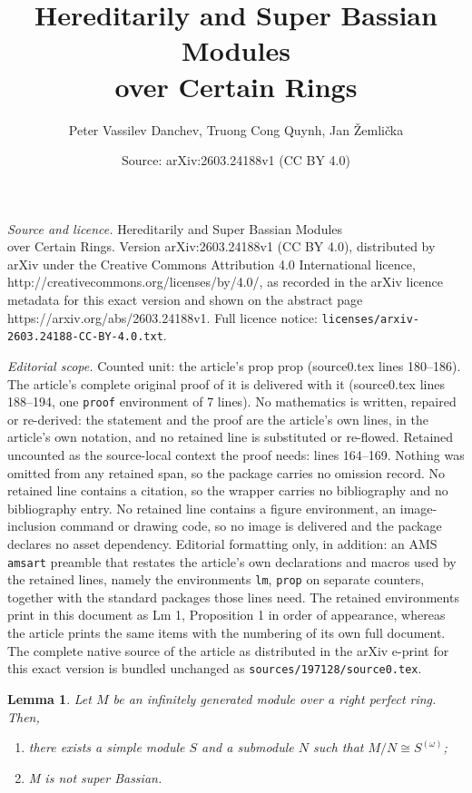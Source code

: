 \documentclass[10pt,a4paper]{amsart}
\title{Hereditarily and Super Bassian Modules \\ over Certain Rings}
\author{Peter Vassilev Danchev, Truong Cong Quynh, Jan \v{Z}emli\v{c}ka}
\date{Source: arXiv:2603.24188v1 (CC BY 4.0)}
\newtheorem{lm}{Lemma}
\begin{document}
\maketitle

\noindent\emph{Source and licence.} Hereditarily and Super Bassian Modules \\ over Certain Rings. Version arXiv:2603.24188v1 (CC BY 4.0), distributed by arXiv under the Creative Commons Attribution 4.0 International licence, http://creativecommons.org/licenses/by/4.0/, as recorded in the arXiv licence metadata for this exact version and shown on the abstract page https://arxiv.org/abs/2603.24188v1. Full licence notice: \texttt{licenses/arxiv-2603.24188-CC-BY-4.0.txt}.\par\smallskip

\noindent\textit{Editorial scope.} Counted unit: the article's prop prop (source0.tex lines 180--186). The article's complete original proof of it is delivered with it (source0.tex lines 188--194, one \texttt{proof} environment of 7 lines). No mathematics is written, repaired or re-derived: the statement and the proof are the article's own lines, in the article's own notation, and no retained line is substituted or re-flowed.  Retained uncounted as the source-local context the proof needs: lines 164--169.  Nothing was omitted from any retained span, so the package carries no omission record.  No retained line contains a citation, so the wrapper carries no bibliography and no bibliography entry.  No retained line contains a figure environment, an image-inclusion command or drawing code, so no image is delivered and the package declares no asset dependency.  Editorial formatting only, in addition: an AMS \texttt{amsart} preamble that restates the article's own declarations and macros used by the retained lines, namely the environments \texttt{lm}, \texttt{prop} on separate counters, together with the standard packages those lines need.  The retained environments print in this document as Lm 1, Proposition 1 in order of appearance, whereas the article prints the same items with the numbering of its own full document.  The complete native source of the article as distributed in the arXiv e-print for this exact version is bundled unchanged as \texttt{sources/197128/source0.tex}.
\begin{lm}\label{perfect} Let $M$ be an infinitely generated module over a right perfect ring. Then,
\begin{enumerate}
\item there exists a simple module $S$ and a submodule $N$ such that $M/N\cong S^{(\omega)}$;
\item M is not super Bassian.
\end{enumerate}
\end{lm}
\end{document}

